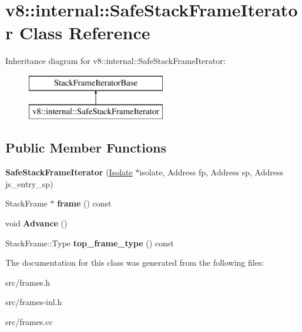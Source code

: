 \hypertarget{classv8_1_1internal_1_1_safe_stack_frame_iterator}{}\section{v8\+:\+:internal\+:\+:Safe\+Stack\+Frame\+Iterator Class Reference}
\label{classv8_1_1internal_1_1_safe_stack_frame_iterator}
Inheritance diagram for v8\+:\+:internal\+:\+:Safe\+Stack\+Frame\+Iterator\+:\begin{figure}[H]
\begin{center}
\leavevmode
\includegraphics[height=2.000000cm]{classv8_1_1internal_1_1_safe_stack_frame_iterator}
\end{center}
\end{figure}
\subsection*{Public Member Functions}
\begin{DoxyCompactItemize}
\item 
\hypertarget{classv8_1_1internal_1_1_safe_stack_frame_iterator_afcd82bdd7ccef981aa610d54f65226e0}{}{\bfseries Safe\+Stack\+Frame\+Iterator} (\hyperlink{classv8_1_1internal_1_1_isolate}{Isolate} $\ast$isolate, Address fp, Address sp, Address js\+\_\+entry\+\_\+sp)\label{classv8_1_1internal_1_1_safe_stack_frame_iterator_afcd82bdd7ccef981aa610d54f65226e0}

\item 
\hypertarget{classv8_1_1internal_1_1_safe_stack_frame_iterator_a92849282fab392c4dfc41769d7f90cfe}{}Stack\+Frame $\ast$ {\bfseries frame} () const \label{classv8_1_1internal_1_1_safe_stack_frame_iterator_a92849282fab392c4dfc41769d7f90cfe}

\item 
\hypertarget{classv8_1_1internal_1_1_safe_stack_frame_iterator_a277df3982f5c8decd465ca163c06c1f2}{}void {\bfseries Advance} ()\label{classv8_1_1internal_1_1_safe_stack_frame_iterator_a277df3982f5c8decd465ca163c06c1f2}

\item 
\hypertarget{classv8_1_1internal_1_1_safe_stack_frame_iterator_ac7da0b6eec5ab71b9bdeade5808c39a1}{}Stack\+Frame\+::\+Type {\bfseries top\+\_\+frame\+\_\+type} () const \label{classv8_1_1internal_1_1_safe_stack_frame_iterator_ac7da0b6eec5ab71b9bdeade5808c39a1}

\end{DoxyCompactItemize}


The documentation for this class was generated from the following files\+:\begin{DoxyCompactItemize}
\item 
src/frames.\+h\item 
src/frames-\/inl.\+h\item 
src/frames.\+cc\end{DoxyCompactItemize}

